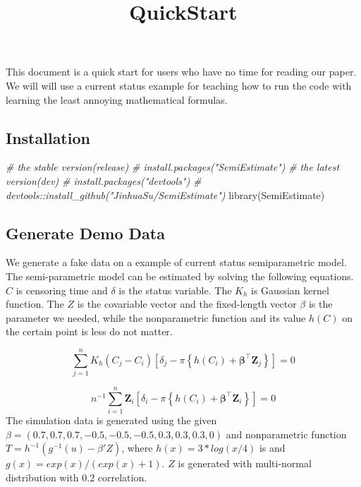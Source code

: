 \documentclass[
]{article}
\title{QuickStart}
\author{}
\date{\vspace{-2.5em}}
\newenvironment{Shaded}{\begin{snugshade}}{\end{snugshade}}
\newcommand{\CommentTok}[1]{\textcolor[rgb]{0.56,0.35,0.01}{\textit{#1}}}
\newcommand{\FunctionTok}[1]{\textcolor[rgb]{0.00,0.00,0.00}{#1}}
\newcommand{\NormalTok}[1]{#1}
\begin{document}
\maketitle

This document is a quick start for users who have no time for reading
our paper. We will will use a current status example for teaching how to
run the code with learning the least annoying mathematical formulas.

\hypertarget{installation}{%
\subsection{Installation}\label{installation}}

\begin{Shaded}
\begin{Highlighting}[]
\CommentTok{\# the stable version(release)}
\CommentTok{\# install.packages("SemiEstimate")}
\CommentTok{\# the latest version(dev)}
\CommentTok{\# install.packages("devtools")}
\CommentTok{\# devtools::install\_github("JinhuaSu/SemiEstimate")}
\FunctionTok{library}\NormalTok{(SemiEstimate)}
\end{Highlighting}
\end{Shaded}

\hypertarget{generate-demo-data}{%
\subsection{Generate Demo Data}\label{generate-demo-data}}

We generate a fake data on a example of current status semiparametric
model. The semi-parametric model can be estimated by solving the
following equations. \(C\) is censoring time and \(\delta\) is the
status variable. The \(K_h\) is Gaussian kernel function. The \(Z\) is
the covariable vector and the fixed-length vector \(\beta\) is the
parameter we needed, while the nonparametric function and its value
\(h(C)\) on the certain point is less do not matter.

\[
\sum_{j=1}^{n} K_{h}\left(C_{j}-C_{i}\right)\left[\delta_{j}-\pi\left\{h\left(C_{i}\right)+\boldsymbol{\beta}^{\top} \mathbf{Z}_{j}\right\}\right]=0
\]

\[
n^{-1} \sum_{i=1}^{n} \mathbf{Z}_{i}\left[\delta_{i}-\pi\left\{h\left(C_{i}\right)+\boldsymbol{\beta}^{\top} \mathbf{Z}_{i}\right\}\right]=0
\] The simulation data is generated using the given
\(\beta = (0.7,0.7,0.7,-0.5,-0.5,-0.5,0.3,0.3,0.3,0)\) and nonparametric
function \(T = h^{-1} (g^{-1}(u) - \beta'Z)\), where
\(h(x) = 3*log(x/4)\) is and \(g(x)=exp(x)/(exp(x)+1)\). \(Z\) is
generated with multi-normal distribution with 0.2 correlation.
\end{document}
